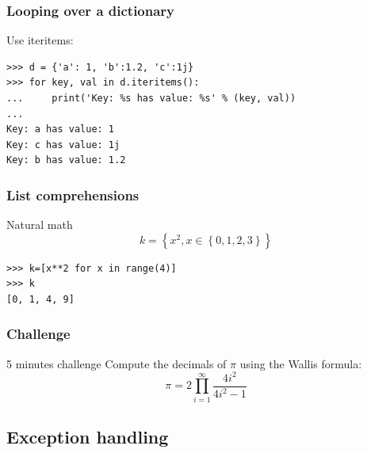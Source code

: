 \documentclass[colorlinks]{beamer}
\begin{document}
\begin{frame}[fragile]\frametitle{Looping over a dictionary}
\begin{block}{Use iteritems:}
\tiny
\begin{verbatim}
>>> d = {'a': 1, 'b':1.2, 'c':1j}
>>> for key, val in d.iteritems():
...     print('Key: %s has value: %s' % (key, val))
... 
Key: a has value: 1
Key: c has value: 1j
Key: b has value: 1.2
\end{verbatim}

\end{block}

\end{frame}
\begin{frame}[fragile]\frametitle{List comprehensions}
\begin{block}{Natural math}
\[
k=\left\{x^2, x \in \left\{0,1,2,3\right\}\right\}
\]
\begin{verbatim}
>>> k=[x**2 for x in range(4)]
>>> k
[0, 1, 4, 9]
\end{verbatim}

\end{block}




\end{frame}

\begin{frame}[fragile]\frametitle{Challenge}
\begin{block}{5 minutes challenge}
Compute the decimals of $\pi$ using the Wallis formula:
\[
\pi=2\prod_{i=1}^{\infty}\frac{4i^2}{4i^2-1}
\]
\end{block}

\end{frame}


\subsection{Exception handling}
\end{document}
